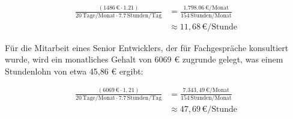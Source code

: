 \begin{align}
    \frac{(1486 \, \text{€} \cdot 1.21)}{20 \, \text{Tage/Monat} \cdot 7.7 \, \text{Stunden/Tag}} &= \frac{1.798.06 \, \text{€/Monat}}{154 \, \text{Stunden/Monat}} \tag{1} \\
    &\approx 11,68 \, \text{€/Stunde} \tag{2}
\end{align}


Für die Mitarbeit eines Senior Entwicklers, der für Fachgespräche konsultiert wurde, wird ein monatliches Gehalt von 6069 € zugrunde gelegt, was einem Stundenlohn von etwa 45,86 € ergibt:

\begin{align}
    \frac{(6069 \, \text{€} \cdot 1,21)}{20 \, \text{Tage/Monat} \cdot 7.7 \, \text{Stunden/Tag}} &= \frac{7.343,49 \, \text{€/Monat}}{154 \, \text{Stunden/Monat}} \tag{1} \\
    &\approx 47,69 \, \text{€/Stunde} \tag{2}
\end{align}

